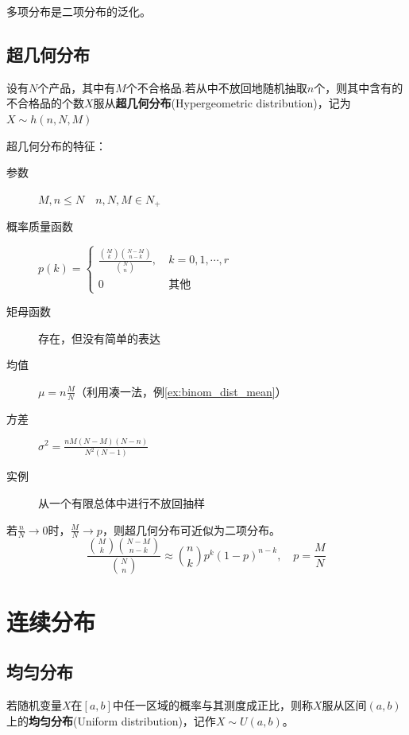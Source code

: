\begin{remark}
    多项分布是二项分布的泛化。
\end{remark}

\subsection{超几何分布}

\begin{definition}
    设有$N$个产品，其中有$M$个不合格品.若从中不放回地随机抽取$n$个，则其中含有的不合格品的个数$X$服从\textbf{超几何分布}(Hypergeometric distribution)，记为$X \sim h(n,N,M)$
\end{definition}

超几何分布的特征：
\begin{description}
    \item[参数] $M,n \le N \quad n,N,M \in N_+$
    \item[概率质量函数] $p(k)=\begin{cases}
                \frac{\binom Mk \binom{N-M}{n-k}} {\binom Nn}  ,\  & k = 0,1,\cdots,r \\
                0                                                  & \text{其他}
            \end{cases}$
    \item[矩母函数] 存在，但没有简单的表达
    \item[均值] $\mu=n\frac{M}{N}$（利用凑一法，例\ref{ex:binom_dist_mean}）
    \item[方差] $\sigma^2=\frac{nM(N-M)(N-n)}{N^2(N-1)}$
    \item[实例] 从一个有限总体中进行不放回抽样
\end{description}

\begin{remark}
    若$\frac{n}{N} \to 0$时，$\frac{M}{N} \to p$，则超几何分布可近似为二项分布。
    \[ \frac{\binom {M}{k} \binom{N-M}{n-k}} {\binom {N}{n}} \approx \binom{n}{k}p^k(1-p)^{n-k} ,\quad p=\frac{M}{N} \]
\end{remark}

\section{连续分布}

\subsection{均匀分布}

\begin{definition}\label{def:Uniform_distribution}
    若随机变量$X$在$[a,b]$中任一区域的概率与其测度成正比，则称$X$服从区间$(a,b)$上的\textbf{均匀分布}(Uniform distribution)，记作$X \sim U(a,b)$。
\end{definition}

